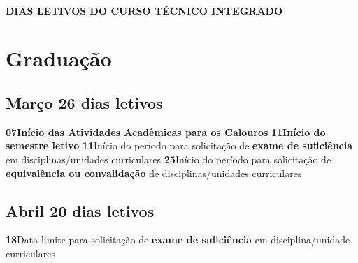 \documentclass[thesis]{hmcposter}
\begin{document}
\begin{poster}
\begin{center}
\end{center}
\vfill
\null
\columnbreak
~
\vfill
\begin{center}
\large \textbf{DIAS LETIVOS DO CURSO TÉCNICO INTEGRADO}
\newline
\null
\newline
\begin{table}
\centering
{}
\end{table}
\newline
\null
\newline
\end{center}
\vfill
\null
\newpage\section{\color{hmcorange}Graduação}\subsection{Março \hfill 26 dias letivos}\textbf{07}\qquad \textbf{Início das Atividades Acadêmicas para os Calouros} \newline \null\textbf{11}\qquad \textbf{Início do semestre letivo} \newline \null\textbf{11}\qquad Início do período para solicitação de \textbf{exame de suficiência} em disciplinas/unidades curriculares \newline \null\textbf{25}\qquad Início do período para solicitação de \textbf{equivalência ou convalidação} de disciplinas/unidades curriculares \newline \null\subsection{Abril \hfill 20 dias letivos}\textbf{18}\qquad Data limite para solicitação de \textbf{exame de suficiência} em disciplina/unidade curriculares \newline \null\vfill\null
\columnbreak

\end{poster}
\end{document}
